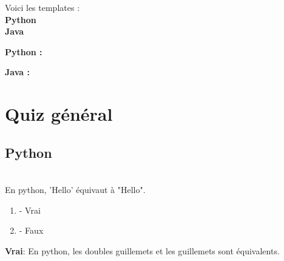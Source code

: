 \begin{Exercice}[20min]
Voici les templates : \\

\textbf{Python} \\

	 

\textbf{Java} \\

	

    
\begin{solution}
\textbf{Python :} \\

    
    
\end{solution}


\begin{solution}   
\textbf{Java :} \\

    
    
    
    
\end{solution}

\end{Exercice}

\section{Quiz général}

\subsection{Python}

\begin{Exercice}[2 minutes]\\
En python, 'Hello' équivaut à "Hello". 

\begin{enumerate}[label=\Alph*]
    \item - Vrai
    \item - Faux
\end{enumerate}
\begin{solution}
    \textbf{Vrai}: En python, les doubles guillemets et les guillemets sont équivalents. 
\end{solution}
\end{Exercice}


